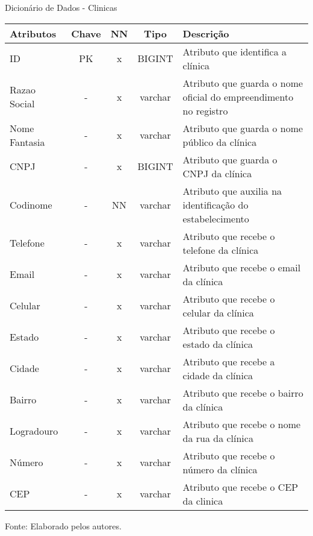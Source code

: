 \documentclass[
    12pt,               %
    openright,          %
    oneside,
    a4paper,            %
    BIBLATEX,           %
    TODO,               %
    english,            %
    brazil              %
    ]{ifsp-spo-inf-ctds}
\begin{document}
      \begin{center}
      \begin{quadro}[H]
      \centering
          \caption{Dicionário de Dados - Clinicas}
          \begin{tabulary}{1.0\textwidth}{|p{9em}|c|c|c|p{19em}|}
        \hline
        Atributos & Chave & NN & Tipo & Descrição\\
        \hline
        ID & PK & x & BIGINT & Atributo que identifica a clínica \\
        \hline
        Razao Social & - & x & varchar & Atributo que guarda o nome oficial do empreendimento no registro\\
        \hline
        Nome Fantasia & - & x & varchar & Atributo que guarda o nome público da clínica\\
        \hline
        CNPJ & - & x & BIGINT & Atributo que guarda o CNPJ da clínica \\
        \hline
        Codinome & - & NN & varchar & Atributo que auxilia na identificação do estabelecimento\\
        \hline
        Telefone & - & x & varchar & Atributo que recebe o telefone da clínica\\
        \hline
        Email & - & x & varchar & Atributo que recebe o email da clínica\\
        \hline
        Celular & - & x & varchar & Atributo que recebe o celular da clínica \\
        \hline
        Estado & - & x & varchar & Atributo que recebe o estado da clínica\\
        \hline
        Cidade & - & x & varchar & Atributo que recebe a cidade da clínica \\
        \hline
        Bairro & - & x & varchar & Atributo que recebe o bairro da clínica \\
        \hline
        Logradouro & - & x & varchar & Atributo que recebe o nome da rua da clínica\\
        \hline
        Número & - & x & varchar & Atributo que recebe o número da clínica \\
        \hline
        CEP & - & x & varchar &  Atributo que recebe o CEP da clinica\\
        \hline
        \end{tabulary}

          \label{qd: md-clinica}
          \centering
        {\footnotesize Fonte: Elaborado pelos autores.}
      \end{quadro}
    \end{center}
\end{document}
